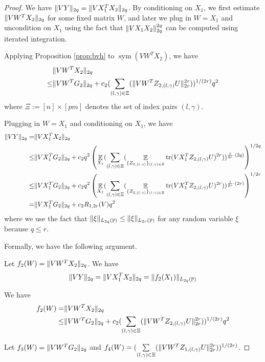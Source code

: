 \documentclass[11pt]{amsart}
\numberwithin{equation}{section}
\numberwithin{equation}{section}
\DeclareMathOperator{\E}{\mathbb{E}}
\DeclareMathOperator{\Pb}{\mathbb{P}}
\DeclareMathOperator*{\tr}{tr}
\DeclareMathOperator{\sym}{sym}
\DeclarePairedDelimiter{\norm}{\lVert}{\rVert}
\begin{document}
\begin{proof}

We have $\norm{VY}_{2q}=\norm{VX_1^TX_2}_{2q}$. By conditioning on $X_1$, we first estimate $\norm{VW^TX_2}_{2q}$ for some fixed matrix $W$, and later we plug in $W=X_1$ and uncondition on $X_1$ using the fact that $\norm{VX_1X_2}_{2q}^{2q}$ can be computed using iterated integration.

Applying Proposition \ref{prop:bvh} to $\sym(VW^TX_2)$, we have
\begin{align*}
    &\norm{VW^TX_2}_{2q}
    \\ \le & \norm{VW^TG_2}_{2q} + c_2(\sum\limits_{(l,\gamma) \in \Xi}(\norm{VW^TZ_{2,(l,\gamma)}U}_{2r}^{2r}))^{1/(2r)}q^{2}
\end{align*}
where $\Xi := [n]\times[pm]$ denotes the set of index pairs $(l,\gamma)$.

Plugging in $W=X_1$ and conditioning on $X_1$, we have
\begin{align*}
    \norm{VY}_{2q}=&\norm{VX_1^TX_2}_{2q}
    \\ \le & \norm{VX_1^TG_2}_{2q} + c_2q^{2}\left(\E_{X_1}(\sum\limits_{(l,\gamma) \in \Xi}(\E_{\{Z_{2,(l,\gamma)}\}_{(l,\gamma) \in \Xi}} \tr(VX_1^TZ_{2,(l,\gamma)}U)^{2r}))^{\frac{1}{2r} \cdot (2q)}\right)^{1/2q}
    \\ \le & \norm{VX_1^TG_2}_{2q} + c_2q^{2}\left(\E_{X_1}(\sum\limits_{(l,\gamma) \in \Xi}(\E_{\{Z_{2,(l,\gamma)}\}_{(l,\gamma) \in \Xi}} \tr(VX_1^TZ_{2,(l,\gamma)}U)^{2r}))^{\frac{1}{2r} \cdot (2r)}\right)^{1/2r}
    \\ = & \norm{VX_1^TG_2}_{2q} + c_2R_{1,2r}(V)q^{2}
\end{align*}
where we use the fact that $\norm{\xi}_{L_{2q}(\Pb)} \le \norm{\xi}_{L_{2r}(\Pb)}$ for any random variable $\xi$ because $q \le r$.

Formally, we have the following argument.

Let $f_2(W)=\norm{VW^TX_2}_{2q}$. We have
\begin{align*}
    \norm{VY}_{2q}=\norm{VX_1^TX_2}_{2q} = \norm{f_2(X_1)}_{L_{2q}(\Pb)} 
\end{align*}

We have
\begin{align*}
    f_2(W)=&\norm{VW^TX_2}_{2q}
    \\ \le & \norm{VW^TG_2}_{2q} + c_2(\sum\limits_{(l,\gamma) \in \Xi}(\norm{VW^TZ_{2,(l,\gamma)}U}_{2r}^{2r}))^{1/(2r)}q^{2}
\end{align*}

Let $f_3(W)=\norm{VW^TG_2}_{2q} $ and $f_4(W)=(\sum\limits_{(l,\gamma) \in \Xi}(\norm{VW^TZ_{1,(l,\gamma)}U}_{2r}^{2r}))^{1/(2r)}$.


\end{proof}
\end{document}

